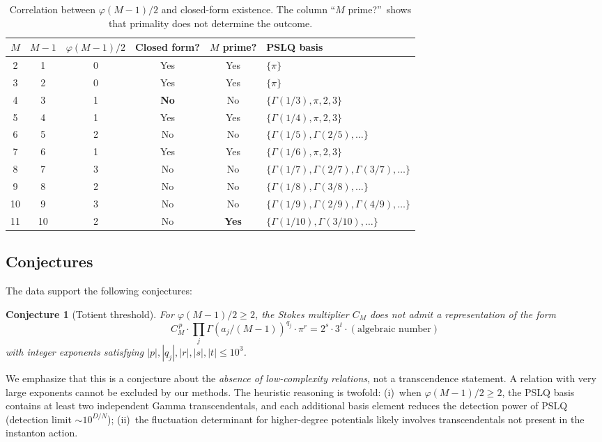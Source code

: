 \documentclass[12pt,a4paper]{article}
\numberwithin{equation}{section}
\theoremstyle{plain}
\newtheorem{conjecture}[theorem]{Conjecture}
\theoremstyle{definition}
\theoremstyle{remark}
\begin{document}
\begin{table}[ht]
\centering
\caption{Correlation between $\varphi(M{-}1)/2$ and closed-form existence.
The column ``$M$ prime?''\ shows that primality does not determine the outcome.}
\label{tab:phi}
\begin{tabular}{@{}cccccl@{}}
\toprule
$M$ & $M{-}1$ & $\varphi(M{-}1)/2$ & Closed form? & $M$ prime? & PSLQ basis \\
\midrule
 2 &  1 & 0 & Yes & Yes & $\{\pi\}$ \\
 3 &  2 & 0 & Yes & Yes & $\{\pi\}$ \\
 4 &  3 & 1 & \textbf{No} & No & $\{\Gamma(1/3), \pi, 2, 3\}$ \\
 5 &  4 & 1 & Yes & Yes & $\{\Gamma(1/4), \pi, 2, 3\}$ \\
 6 &  5 & 2 & No  & No & $\{\Gamma(1/5), \Gamma(2/5), \ldots\}$ \\
 7 &  6 & 1 & Yes & Yes & $\{\Gamma(1/6), \pi, 2, 3\}$ \\
 8 &  7 & 3 & No  & No & $\{\Gamma(1/7), \Gamma(2/7), \Gamma(3/7), \ldots\}$ \\
 9 &  8 & 2 & No  & No & $\{\Gamma(1/8), \Gamma(3/8), \ldots\}$ \\
10 &  9 & 3 & No  & No & $\{\Gamma(1/9), \Gamma(2/9), \Gamma(4/9), \ldots\}$ \\
11 & 10 & 2 & No  & \textbf{Yes} & $\{\Gamma(1/10), \Gamma(3/10), \ldots\}$ \\
\bottomrule
\end{tabular}
\end{table}

\subsection{Conjectures}
\label{sec:conjectures}

The data support the following conjectures:

\begin{conjecture}[Totient threshold]\label{conj:phi}
For $\varphi(M{-}1)/2 \ge 2$, the Stokes multiplier $C_M$ does not admit a
representation of the form
\begin{equation}\label{eq:conj-form}
  C_M^{\,p} \cdot \prod_{j} \Gamma(a_j/(M{-}1))^{q_j} \cdot \pi^r
  = 2^s \cdot 3^t \cdot (\text{algebraic number})
\end{equation}
with integer exponents satisfying $|p|, |q_j|, |r|, |s|, |t| \le 10^3$.
\end{conjecture}

We emphasize that this is a conjecture about the \emph{absence of
low-complexity relations}, not a transcendence statement. A relation
with very large exponents cannot be excluded by our methods. The
heuristic reasoning is twofold: (i)~when $\varphi(M{-}1)/2 \ge 2$,
the PSLQ basis contains at least two independent Gamma transcendentals,
and each additional basis element reduces the detection power of PSLQ
(detection limit $\sim 10^{D/N}$); (ii)~the fluctuation determinant
for higher-degree potentials likely involves transcendentals not
present in the instanton action.
\end{document}
